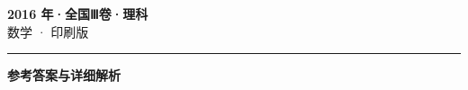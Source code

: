 \documentclass[zihao=5, a4paper]{ctexart}
\begin{document}
\begin{center}
  {\Large\bfseries 2016 年·全国Ⅲ卷·理科}\\[4pt]
  {\large 数学 · 印刷版}
\end{center}
\medskip
{}

\par\bigskip\hrule\bigskip
{}
\begin{center}{\large\bfseries 参考答案与详细解析}\end{center}
\smallskip

\end{document}
